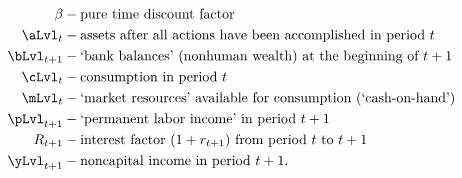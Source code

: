   \begin{equation*}\begin{gathered}\begin{aligned}
        {\DiscAlt}  & - \text{pure time discount factor} \\
        {\aLvl}_{t}  & - \text{assets after all actions have been accomplished in period $t$} \\
        {\bLvl}_{t+1}  & - \text{`bank balances' (nonhuman wealth) at the beginning of $t+1$} \\
        {\cLvl}_{t}  & - \text{consumption in period $t$} \\
        {\mLvl}_{t}  & - \text{`market resources' available for consumption (`cash-on-hand')} \\
        \pLvl_{t+1}  & - \text{`permanent labor income' in period $t+1$} \\
        \Rfree_{t+1}  & - \text{interest factor $(1+\rfree_{t+1})$ from period $t$ to $t+1$ } \\
        {\yLvl}_{t+1}  & - \text{noncapital income in period $t+1$}.
      \end{aligned}\end{gathered}\end{equation*}
